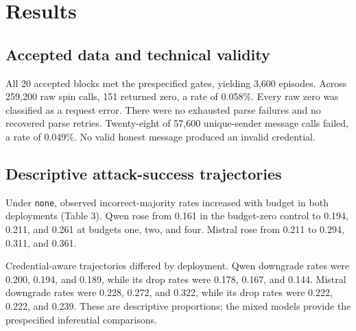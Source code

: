 \documentclass[11pt]{article}
\begin{document}
\section{Results}

\subsection{Accepted data and technical validity}

All 20 accepted blocks met the prespecified gates, yielding 3,600 episodes. Across 259,200 raw spin calls, 151 returned zero, a rate of 0.058\%. Every raw zero was classified as a request error. There were no exhausted parse failures and no recovered parse retries. Twenty-eight of 57,600 unique-sender message calls failed, a rate of 0.049\%. No valid honest message produced an invalid credential.

\subsection{Descriptive attack-success trajectories}

Under \texttt{none}, observed incorrect-majority rates increased with budget in both deployments (Table 3). Qwen rose from 0.161 in the budget-zero control to 0.194, 0.211, and 0.261 at budgets one, two, and four. Mistral rose from 0.211 to 0.294, 0.311, and 0.361.

Credential-aware trajectories differed by deployment. Qwen downgrade rates were 0.200, 0.194, and 0.189, while its drop rates were 0.178, 0.167, and 0.144. Mistral downgrade rates were 0.228, 0.272, and 0.322, while its drop rates were 0.222, 0.222, and 0.239. These are descriptive proportions; the mixed models provide the prespecified inferential comparisons.


\begin{table}[htbp]
\centering
\caption{Incorrect-terminal-majority rates by deployment, policy, and budget}
\scriptsize
{}
\end{table}
\FloatBarrier
\end{document}
